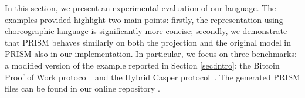 {In this section, we present an experimental evaluation of our
  language.  The examples provided highlight two main points: firstly,
  the representation using choreographic language is significantly
  more concise; secondly, we demonstrate that PRISM behaves similarly
  on both the projection and the original model in PRISM also in our
  implementation. }
In particular, we focus on three benchmarks: a modified version of the
example reported in Section \ref{sec:intro}; the Bitcoin Proof of Work
protocol~\cite{DBLP:journals/concurrency/BistarelliNGLMV23} and the
Hybrid Casper
protocol~\cite{DBLP:journals/distribledger/GallettaLMV23}.  The
generated PRISM files can be found in our online repository
\cite{repository}.

